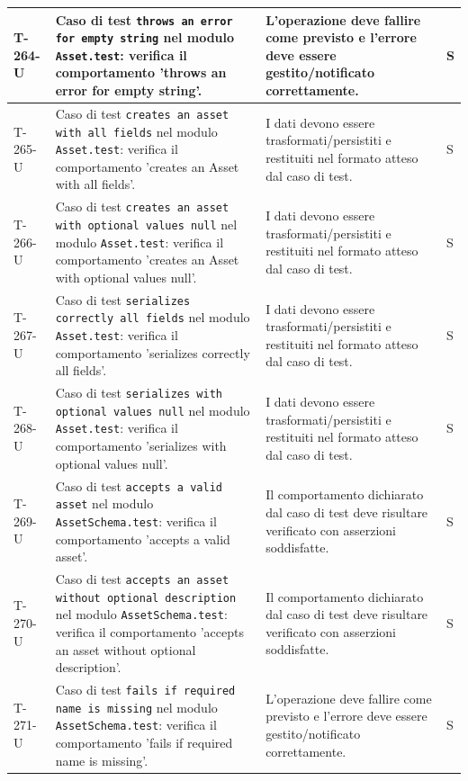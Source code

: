 \documentclass[a4paper,12pt]{article}
\begin{document}
{{\begin{longtable}{|>{\RaggedRight\arraybackslash}p{1.55cm}|>{\RaggedRight\arraybackslash}p{8.0cm}|>{\RaggedRight\arraybackslash}p{4.6cm}|>{\RaggedRight\arraybackslash}p{1.2cm}|}
        \hline
        T-264-U & Caso di test \texttt{throws an error for empty string} nel modulo \texttt{Asset.test}: verifica il comportamento 'throws an error for empty string'. & L'operazione deve fallire come previsto e l'errore deve essere gestito/notificato correttamente. & S \\
        \hline
        T-265-U & Caso di test \texttt{creates an asset with all fields} nel modulo \texttt{Asset.test}: verifica il comportamento 'creates an Asset with all fields'. & I dati devono essere trasformati/persistiti e restituiti nel formato atteso dal caso di test. & S \\
        \hline
        T-266-U & Caso di test \texttt{creates an asset with optional values null} nel modulo \texttt{Asset.test}: verifica il comportamento 'creates an Asset with optional values null'. & I dati devono essere trasformati/persistiti e restituiti nel formato atteso dal caso di test. & S \\
        \hline
        T-267-U & Caso di test \texttt{serializes correctly all fields} nel modulo \texttt{Asset.test}: verifica il comportamento 'serializes correctly all fields'. & I dati devono essere trasformati/persistiti e restituiti nel formato atteso dal caso di test. & S \\
        \hline
        T-268-U & Caso di test \texttt{serializes with optional values null} nel modulo \texttt{Asset.test}: verifica il comportamento 'serializes with optional values null'. & I dati devono essere trasformati/persistiti e restituiti nel formato atteso dal caso di test. & S \\
        \hline
        T-269-U & Caso di test \texttt{accepts a valid asset} nel modulo \texttt{AssetSchema.test}: verifica il comportamento 'accepts a valid asset'. & Il comportamento dichiarato dal caso di test deve risultare verificato con asserzioni soddisfatte. & S \\
        \hline
        T-270-U & Caso di test \texttt{accepts an asset without optional description} nel modulo \texttt{AssetSchema.test}: verifica il comportamento 'accepts an asset without optional description'. & Il comportamento dichiarato dal caso di test deve risultare verificato con asserzioni soddisfatte. & S \\
        \hline
        T-271-U & Caso di test \texttt{fails if required name is missing} nel modulo \texttt{AssetSchema.test}: verifica il comportamento 'fails if required name is missing'. & L'operazione deve fallire come previsto e l'errore deve essere gestito/notificato correttamente. & S \\

\end{longtable}}}
\end{document}
